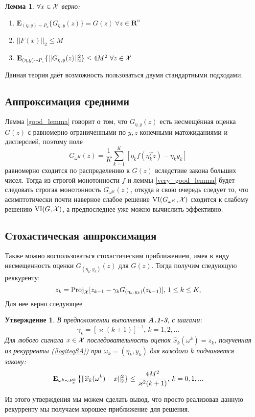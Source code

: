 \documentclass[11pt]{article}
\def\cX{{\cal X}}
\def\bR{{\mathbf{R}}}
\def\cX{{\cal X}}
\def\bE{{\mathbf{E}}}
\def\VI{{\textrm{VI}}}
\def\Proj{{\mathrm{Proj}}}
\newtheorem{lemma}{Лемма}[section]
\newtheorem{proposition}{Утверждение}[section]
\begin{document}
\begin{lemma}
\label{good_lemma}
    $\forall{x} \in \cX{}$ верно:
    \begin{enumerate}
        \item  $\bE_{(\eta,y) \sim P_x} \{ G_{\eta,y}(z)\} = G(z)~ \forall{z \in \bR^n}$
        \item $ ||F(x)||_2 \leq M$
        \item  $\bE_{(\eta,y) \sim P_x} \{ ||G_{\eta,y}(z)||_2^2\} \leq 4M^2 ~ \forall{z \in \cX{}}$
    \end{enumerate}
\end{lemma}

Данная теория даёт возможность пользоваться двумя стандартными подходами.

\subsection{Аппроксимация средними}
Лемма \eqref{good_lemma} говорит о том, что $G_{\eta,y}(z)$ есть несмещённая оценка $G(z)$ с равномерно ограниченными по $y,z$ конечными матожиданиями и дисперсией, поэтому поле \begin{equation}
    \label{g_w}
    G_{\omega^K}(z) =\frac{1}{K} \sum\limits_{k=1}^K[\eta_k f(\eta_k^Tz)- \eta_k y_k]
\end{equation}
равномерно сходится по распределению к $G(z)$ вследствие закона больших чисел. Тогда из строгой монотонности $f$ и леммы \eqref{very_good_lemma} будет следовать строгая монотонность $G_{\omega^K}(z)$, откуда в свою очередь следует то, что асимптотически почти наверное слабое решение $\VI{}(G_{\omega^K}, \cX)$ сходится к слабому решению $\VI{}(G, \cX)$, а предпоследнее уже можно вычислить эффективно.   

\subsection{Стохастическая аппроксимация}
Также можно воспользоваться стохастическим приближением, имея в виду несмещенность оценки $G_{(\eta_k,y_k)}(z)$ для $G(z)$. Тогда получим следующую реккуренту:
\begin{equation}\label{logiteqSA}
z_{k}=\Proj_{\cX}[z_{k-1}-\gamma_k G_{(\eta_k,y_k)}(z_{k-1})],\,1\leq k\leq K,
\end{equation}
Для нее верно следующее
\begin{proposition}
    В предположении выполнения \textbf{A.1-3}, с шагами: 
   \begin{equation}\label{logiteq50}
        \gamma_k=[\varkappa (k+1)]^{-1},\,k=1,2,...
    \end{equation} 
    Для любого сигнала $x \in \cX$ последовательность оценок $\widehat{x}_k(\omega^{k})=z_{k}$, полученная из рекурренты {\rm (\ref{logiteqSA}})
    при $\omega_k=(\eta_k,y_k)$ для каждого $k$ подчиняется закону:
    \begin{equation}\label{logiteq51}
        \bE_{\omega^k\sim P_x^k}\left\{\|\widehat{x}_k(\omega^k)-x\|_2^2\right\}\leq {4M^2\over\varkappa^2(k+1)},\,k=0,1,...
    \end{equation}
\end{proposition}
Из этого утверждения мы можем сделать вывод, что просто реализовав данную рекурренту мы получаем хорошее приближение для решения.
\end{document}
